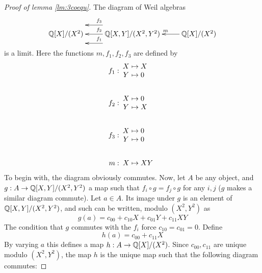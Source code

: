 \begin{proof}[Proof of lemma \ref{lm:3coequ}]
  The diagram of Weil algebras
  \begin{equation}
    \xymatrix{
      \Q[X]/(X^2) & \Q[X,Y]/(X^2,Y^2) \ar@<3ex>[l]_{f_1} \ar[l]_{f_2} \ar@<-3ex>[l]_{f_3} & \Q[X]/(X^2) \ar[l]_{m} 
    }
    \label{dg:3equWalg}
  \end{equation}
  is a limit. Here the functions \( m,f_1,f_2,f_3 \) are defined by
  \begin{align*}
    f_1: & \begin{array}{c@{\hspace{0.3em}}l} X & \mapsto X \\ Y & \mapsto 0 \end{array} \\[4ex]
    f_2: & \begin{array}{c@{\hspace{0.3em}}l} X & \mapsto 0 \\ Y & \mapsto X \end{array} \\[4ex]
    f_3: & \begin{array}{c@{\hspace{0.3em}}l} X & \mapsto 0 \\ Y & \mapsto 0 \end{array} \\[4ex]
    m:   & \begin{array}{c@{\hspace{0.3em}}l} X & \mapsto XY                 \end{array} 
  \end{align*}
  To begin with, the diagram obviously commutes. Now, let \( A \) be any object, and \( g:A\to \mathbb{Q}[X,Y]/(X^2,Y^2) \) a map such that \( f_i\circ g = f_j\circ g \) for any \( i,j \) (\( g \) makes a similar diagram commute). Let \( a\in A \). Its image under \( g \) is an element of \( \mathbb{Q}[X,Y]/(X^2,Y^2) \), and such can be written, modulo \( (X^2,Y^2) \) as
  \begin{equation*}
    g(a) = c_{00} + c_{10}X + c_{01}Y + c_{11}XY
  \end{equation*}
  The condition that \( g \) commutes with the \( f_i \) force \( c_{10}=c_{01}=0 \). Define
  \begin{equation*}
    h(a) = c_{00} + c_{11}X
  \end{equation*}
  By varying \( a \) this defines a map \( h:A\to \mathbb{Q}[X]/(X^2) \). Since \( c_{00},c_{11} \) are unique modulo \( (X^2,Y^2) \), the map \( h \) is the unique map such that the following diagram commutes:

\end{proof}
